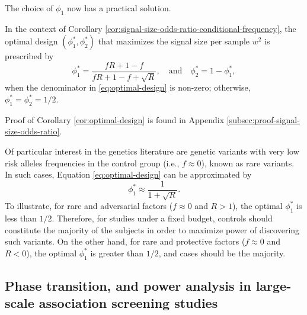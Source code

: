 The choice of $\phi_1$ now has a practical solution.

\begin{corollary} \label{cor:optimal-design}
In the context of Corollary \ref{cor:signal-size-odds-ratio-conditional-frequency},
the optimal design $(\phi^*_1, \phi^*_2)$ that maximizes the signal size per sample $w^2$ is prescribed by
\begin{equation} \label{eq:optimal-design}
    \phi_1^* = \frac{fR+1-f}{fR+1-f+\sqrt{R}}, \quad\text{and}\quad 
    \phi_2^* = 1-\phi_1^*,
\end{equation}
when the denominator in \eqref{eq:optimal-design} is non-zero; otherwise, $\phi_1^*=\phi_2^*=1/2$.
\end{corollary} 

Proof of Corollary \ref{cor:optimal-design} is found in Appendix \ref{subsec:proof-signal-size-odds-ratio}. 

Of particular interest in the genetics literature are genetic variants with very low risk alleles frequencies in the control group (i.e., $f\approx 0$), known as rare variants.
In such cases, Equation \eqref{eq:optimal-design} can be approximated by
\begin{equation} \label{eq:optimal-design-approx}
    \phi_1^* \approx \frac{1}{1 + \sqrt{R}}.
\end{equation}
To illustrate, for rare and adversarial factors ($f\approx0$ and $R>1$), the optimal $\phi_1^*$ is less than $1/2$.
Therefore, for studies under a fixed budget, controls should constitute the majority of the subjects in order to maximize power of discovering such variants.
On the other hand, for rare and protective factors ($f\approx0$ and $R<0$), the optimal $\phi_1^*$ is greater than $1/2$, and cases should be the majority.

\subsection{Phase transition, and power analysis in large-scale association screening studies}




